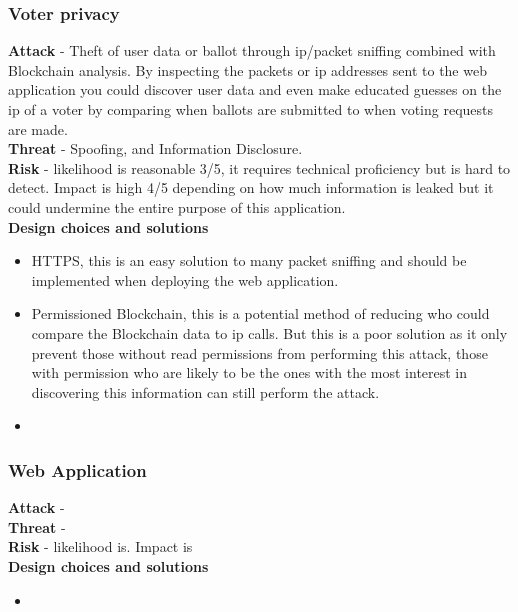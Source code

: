 \documentclass{entcs}
\begin{document}
\subsubsection{Voter privacy}
\textbf{Attack} - Theft of user data or ballot through ip/packet sniffing \cite{ansari2002packet} combined with Blockchain analysis. By inspecting the packets or ip addresses sent to the web application you could discover user data and even make educated guesses on the ip of a voter by comparing when ballots are submitted to when voting requests are made. \\
\textbf{Threat} - Spoofing, and Information Disclosure. \\
\textbf{Risk} - likelihood is reasonable 3/5, it requires technical proficiency but is hard to detect. Impact is high 4/5 depending on how much information is leaked but it could undermine the entire purpose of this application.\\
\textbf{Design choices and solutions}
\begin{itemize}
    \item HTTPS, this is an easy solution to many packet sniffing and should be implemented when deploying the web application.
    \item Permissioned Blockchain, this is a potential method of reducing who could compare the Blockchain data to ip calls. But this is a poor solution as it only prevent those without read permissions from performing this attack, those with permission who are likely to be the ones with the most interest in discovering this information can still perform the attack.
    \item
\end{itemize}

\subsubsection{Web Application}
\textbf{Attack} - \\
\textbf{Threat} -  \\
\textbf{Risk} - likelihood is. Impact is \\
\textbf{Design choices and solutions}
\begin{itemize}
    \item
\end{itemize}




\end{document}
